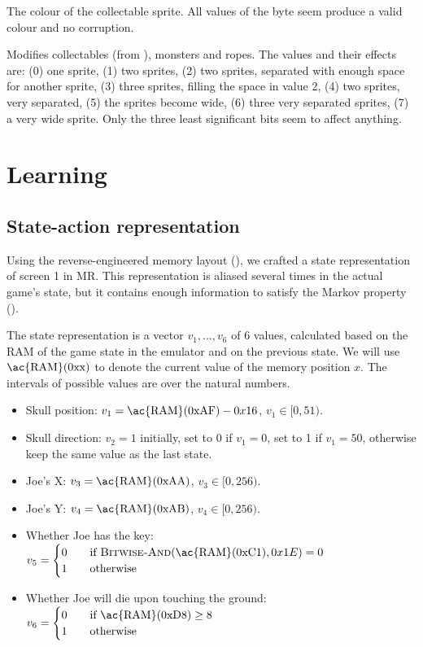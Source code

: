 {\begin{enumerate}
 The colour of the collectable sprite. All values
of the byte seem produce a valid colour and no corruption.

 Modifies collectables (from
\hyperref[ram:collectable]{}), monsters and ropes. The values and their
effects are: (0) one sprite, (1) two sprites, (2) two sprites, separated with enough
space for another sprite, (3) three sprites, filling the space in value 2, (4)
two sprites, very separated, (5) the sprites become wide, (6) three very
separated sprites, (7) a very wide sprite. Only the three least significant bits
seem to affect anything.

\end{enumerate}
}

\section{Learning}
\subsection{State-action representation}
Using the reverse-engineered memory layout (), we
crafted a state representation of screen 1 in \acl{MR}. This
representation is aliased several times in the actual game's state, but it
contains enough information to satisfy the Markov property ().

{
\newcommand{\n}[1]{\text{0x#1}}
\newcommand{\ram}[1]{\text{\ac{RAM}}(\n{#1})}

The state representation is a vector $v_1,\dots,v_6$ of 6 values, calculated
based on the \ac{RAM} of the game state in the emulator and on the previous
state. We will use $\ram{x}$ to denote the current value of the memory position
$x$. The intervals of possible values are over the natural numbers.

\begin{itemize}
  \item Skull position: $v_1 = \ram{AF} - 0x16$, $v_1 \in [0, 51)$.
  \item Skull direction: $v_2 = 1$ initially, set to 0 if $v_1=0$, set to 1 if
    $v_1=50$, otherwise keep the same value as the last state.
  \item Joe's X: $v_3 = \ram{AA}$, $v_3 \in [0, 256)$.
  \item Joe's Y: $v_4 = \ram{AB}$, $v_4 \in [0, 256)$.
  \item Whether Joe has the key: $v_5 =
    \begin{cases}
      0 &\quad\text{if }\textsc{Bitwise-And}(\ram{C1}, 0x1E) = 0 \\
      1 &\quad\text{otherwise}
    \end{cases}$
  \item Whether Joe will die upon touching the ground: $v_6 =
    \begin{cases}
      0 &\quad\text{if }\ram{D8} \geq 8 \\
      1 &\quad\text{otherwise}
    \end{cases}$
\end{itemize}
}

